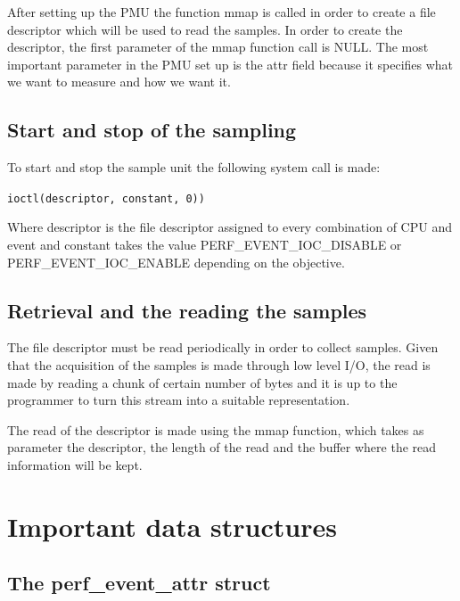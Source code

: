 After setting up the PMU the function mmap is called in order to create a file descriptor which will be used to read the samples. In order to create the descriptor, the first parameter of the mmap function call is NULL. The most important parameter in the PMU set up is the attr field because it specifies what we want to measure and how we want it.  

\subsection{Start and stop of the sampling}\label{section:start-sto}

To start and stop the sample unit the following system call is made: 
\\
\begin{center}
\texttt{ioctl(descriptor, constant, 0))}
\end{center}
Where descriptor is the file descriptor assigned to every combination of CPU and event and constant takes the value PERF\_EVENT\_IOC\_DISABLE or PERF\_EVENT\_IOC\_ENABLE depending on the objective.


\subsection{Retrieval and the reading the samples}\label{section:retr-reaf}

The file descriptor must be read periodically in order to collect samples. Given that the acquisition of the samples is made through low level I/O, the read is made by reading a chunk of certain number of bytes and it is up to the programmer to turn this stream into a suitable representation. 

The read of the descriptor is made using the mmap function, which takes as parameter the descriptor, the length of the read and the buffer where the read information will be kept.

\section{Important data structures}\label{section:important structs}

\subsection{The perf\_event\_attr struct}\label{section:pea-stru}

